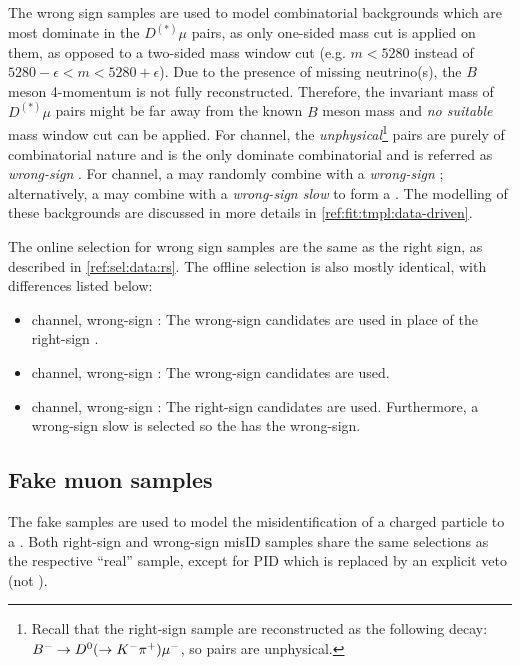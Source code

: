 The wrong sign samples are used to model combinatorial backgrounds which are
most dominate in the $D^{(*)}\mu$ pairs,
as only one-sided mass cut is applied on them, as opposed to a two-sided
mass window cut
(e.g. $m < 5280$ instead of $5280 - \epsilon < m < 5280 + \epsilon$).
Due to the presence of missing neutrino(s), the $B$ meson 4-momentum is not
fully reconstructed.
Therefore,
the invariant mass of $D^{(*)}\mu$ pairs might be far away from the known $B$
meson mass and \emph{no suitable} mass window cut can be applied.
For \Dz channel, the \emph{unphysical}\footnote{
    Recall that the right-sign sample are reconstructed as the following decay:
    ${{{B}^-}} \rightarrow {\ensuremath{{D}^0}} (\rightarrow {\ensuremath{{K}^-}} {\ensuremath{{\pi}^+}}) {\mu^-}$,
    so \Dz\mup pairs are unphysical.
} \Dz\mup pairs are purely of combinatorial
nature and is the only dominate combinatorial and is referred as
\emph{wrong-sign \mu}.
For \Dstar channel, a \Dstarp may randomly combine with a
\emph{wrong-sign \mup}; alternatively, a \Dz may combine with a
\emph{wrong-sign slow \pim} to form a \Dstarm.
The modelling of these backgrounds are discussed in more details in
\cref{ref:fit:tmpl:data-driven}.

The online selection for wrong sign samples are the same as the right sign,
as described in \cref{ref:sel:data:rs}.
The offline selection is also mostly identical, with differences listed below:

\begin{itemize}
    \item \Dz channel, wrong-sign \mu:
        The wrong-sign \Dz\mup candidates are used in place of the right-sign
        \Dz\mun.
    \item \Dstar channel, wrong-sign \mu:
        The wrong-sign \Dz\mup candidates are used.
    \item \Dstar channel, wrong-sign \pi:
        The right-sign \Dz\mun candidates are used.
        Furthermore, a wrong-sign slow \pim is selected so the \Dstar has the
        wrong-sign.
\end{itemize}


\subsection{Fake muon samples}

The fake \muon samples are used to model the misidentification of a charged
particle to a \muon.
Both right-sign and wrong-sign misID samples share the same selections
as the respective ``real'' \muon sample,
except for \muon PID which is replaced by an explicit \muon veto
(not \isMuon).
